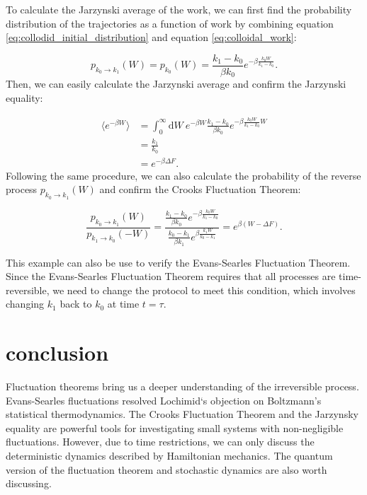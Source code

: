 \documentclass[ reprint, amsmath,amssymb, aps,]{revtex4-1}
\begin{document}
To calculate the Jarzynski average of the work, we can first find the probability distribution of the trajectories as a function of work by combining equation \ref{eq:collodid_initial_distribution} and equation \ref{eq:colloidal_work}:

\begin{equation}
p_{k_0\to k_1}(W)=p_{k_0}(W)=\frac{k_1-k_0}{\beta k_0}e^{-\beta\frac{k_0W}{k_1-k_0}}.
\end{equation}
Then, we can easily calculate the Jarzynski average and confirm the Jarzynski equality: 

\begin{equation}
\begin{split}
\langle e^{-\beta W}\rangle
&=\int_0^\infty \mathrm{d}W\ e^{-\beta W}\frac{k_1-k_0}{\beta k_0}e^{-\beta\frac{k_0W}{k_1-k_0}W}\\
&=\frac{k_1}{k_0}\\
&=e^{-\beta \Delta F}.
\end{split}
\end{equation}
Following the same procedure, we can also calculate the probability of the reverse process $p_{k_0\to k_1}(W)$ and confirm the Crooks Fluctuation Theorem: 

\begin{equation}
\frac{p_{k_0\to k_1}(W)}{p_{k_1\to k_0}(-W)}=\frac{\frac{k_1-k_0}{\beta k_0}e^{-\beta\frac{k_0W}{k_1-k_0}}}{\frac{k_0-k_1}{\beta k_1}e^{\beta\frac{k_1W}{k_0-k_1}}}=e^{\beta(W-\Delta F)}.
\end{equation}

This example can also be use to verify the Evans-Searles Fluctuation Theorem. Since the Evans-Searles Fluctuation Theorem requires that all processes are time-reversible, we need to change the protocol to meet this condition, which involves changing $k_1$ back to $k_0$ at time $t=\tau$.

\section{conclusion}

Fluctuation theorems bring us a deeper understanding of the irreversible process. Evans-Searles fluctuations resolved Lochimid‘s objection on Boltzmann's statistical thermodynamics. The Crooks Fluctuation Theorem and the Jarzynsky equality are powerful tools for investigating small systems with non-negligible fluctuations. However, due to time restrictions, we can only discuss the deterministic dynamics described by Hamiltonian mechanics. The quantum version of the fluctuation theorem and stochastic dynamics are also worth discussing. 
\end{document}
